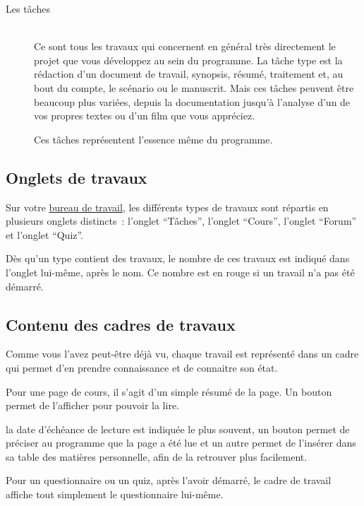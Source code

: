 \begin{description}
\item[Les tâches] \hfill \\
 Ce sont tous les travaux qui concernent en général très directement le projet que vous développez au sein du programme. La tâche type est la rédaction d'un document de travail, synopsis, résumé, traitement et, au bout du compte, le scénario ou le manuscrit. Mais ces tâches peuvent être beaucoup plus variées, depuis la documentation jusqu'à l'analyse d'un de vos propres textes ou d'un film que vous appréciez.



Ces tâches représentent l'essence même du programme.
\end{description}

\subsection{Onglets de travaux}\hypertarget{onglets-de-travaux}{}\label{onglets-de-travaux}

Sur votre \hyperlink{bureau}{bureau de travail}, les différents types de travaux sont répartis en plusieurs onglets distincts~{}: l'onglet ``Tâches'', l'onglet ``Cours'', l'onglet ``Forum'' et l'onglet ``Quiz''.

Dès qu'un type contient des travaux, le nombre de ces travaux est indiqué dans l'onglet lui-même, après le nom. Ce nombre est en rouge si un travail n'a pas été démarré.

\subsection{Contenu des cadres de travaux}\hypertarget{contenu-des-cadres-de-travaux}{}\label{contenu-des-cadres-de-travaux}

Comme vous l'avez peut-être déjà vu, chaque travail est représenté dans un cadre qui permet d'en prendre connaissance et de connaitre son état.

Pour une page de cours, il s'agit d'un simple résumé de la page. Un bouton permet de l'afficher pour pouvoir la lire.


la date d'échéance de lecture est indiquée le plus souvent, un bouton permet de préciser au programme que la page a été lue et un autre permet de l'insérer dans sa table des matières personnelle, afin de la retrouver plus facilement.

Pour un questionnaire ou un quiz, après l'avoir démarré, le cadre de travail affiche tout simplement le questionnaire lui-même.

